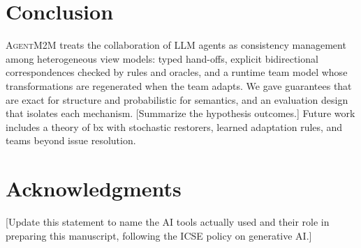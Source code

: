 \documentclass[10pt, anonymous, conference]{IEEEtran}
\theoremstyle{definition}
\theoremstyle{plain}
\theoremstyle{remark}
\newcommand{\tool}{\textsc{AgentM2M}}
\newcommand{\fixme}[1]{{\color{red}[#1]}}
\newcommand{\hyp}[1]{{\color{blue}#1}}           %
\begin{document}
\section{Conclusion}
\label{sec:conclusion}
\tool{} treats the collaboration of LLM agents as consistency management
among heterogeneous view models: typed hand-offs, explicit bidirectional
correspondences checked by rules and oracles, and a runtime team model whose
transformations are regenerated when the team adapts. We gave guarantees that
are exact for structure and probabilistic for semantics, and an evaluation
design that isolates each mechanism. \hyp{[Summarize the hypothesis outcomes.]}
Future work includes a theory of bx with stochastic restorers, learned
adaptation rules, and teams beyond issue resolution.

\section{Acknowledgments}
\fixme{Update this statement to name the AI tools actually used and their role
in preparing this manuscript, following the ICSE policy on generative AI.}


\clearpage


\end{document}
